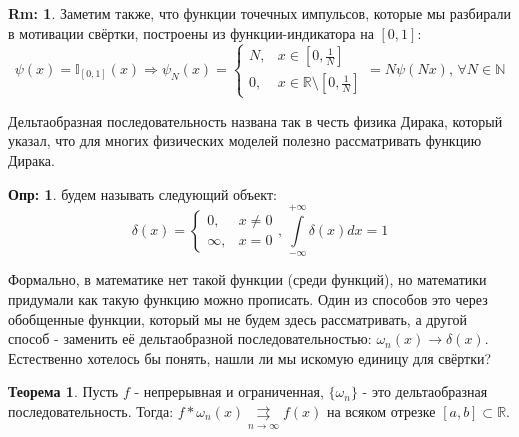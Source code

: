 \documentclass[12pt]{article}
\newcommand{\MR}{\mathbb{R}}
\newcommand{\MN}{\mathbb{N}}
\newcommand{\MTI}{\mathbb{I}}
\theoremstyle{definition}
\newtheorem{defn}{Опр:}
\newtheorem{rem}{Rm:}
\newtheorem{theorem}{Теорема}
\newcommand{\ddint}[2]{\displaystyle\int\limits_{#1}^{#2}}
\newcommand{\uconvm}[2]{\overset{#1}{\underset{#2}{\rightrightarrows}}}
\begin{document}
\begin{rem}
	Заметим также, что функции точечных импульсов, которые мы разбирали в мотивации свёртки, построены из функции-индикатора на $[0,1]$:
	$$
		\psi(x) = \MTI_{[0,1]}(x) \Rightarrow
		\psi_N(x) = \left\{
		\begin{array}{ll}
			N,& x \in \left[0,\frac{1}{N}\right]\\[4pt]
			0, & x \in \MR \setminus \left[0,\frac{1}{N}\right]
		\end{array}
		\right. = N\psi(Nx), \, \forall N \in \MN 
	$$ 	
\end{rem}
Дельтаобразная последовательность названа так в честь физика Дирака, который указал, что для многих физических моделей полезно рассматривать функцию Дирака.
\begin{defn}
	 будем называть следующий объект:
	$$
		\delta(x) = \left\{
		\begin{array}{rl}
			0, & x \neq 0\\
			\infty, & x =0
		\end{array}
		\right., \, \ddint{-\infty}{+\infty}\delta(x)dx = 1
	$$
\end{defn}
Формально, в математике нет такой функции (среди функций), но математики придумали как такую функцию можно прописать. Один из способов это через обобщенные функции, который мы не будем здесь рассматривать, а другой способ - заменить её дельтаобразной последовательностью: $\omega_n(x) \to \delta (x)$. Естественно хотелось бы понять, нашли ли мы искомую единицу для свёртки?

\begin{theorem}
	Пусть $f$ - непрерывная и ограниченная, $\{\omega_n\}$ - это дельтаобразная последовательность. Тогда: $f *\omega_n(x) \uconvm{}{n \to \infty}f(x)$ на всяком отрезке $[a,b] \subset \MR$.
\end{theorem} 
\end{document}
